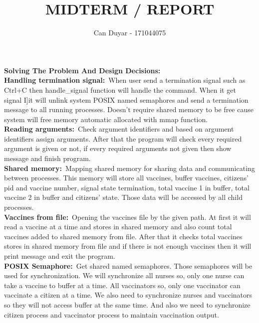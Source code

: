 \documentclass[a4 paper]{article}
\title{MIDTERM / REPORT}
\author{ Can Duyar - 171044075}
\begin{document}
\date{}
\maketitle

{\color{red}\large\textbf {Solving The Problem And Design Decisions:}}\newline\\
\newline
\textbf{Handling termination signal:}\newline\
\phantom{beta}When user send a termination signal such as Ctrl+C then handle\_signal function will handle the command. When it get signal I]it will unlink system POSIX named semaphores and send a termination message to all running processes. Doesn’t require shared memory to be free cause system will free memory automatic allocated with mmap function.\newline\\

\textbf{Reading arguments:}\newline\
\phantom{beta}Check argument identifiers and based on argument identifiers assign arguments. After that the program will check every required argument is given or not, if every required arguments not given then show message and finish program. \newline\\

\textbf{Shared memory:}\newline\
\phantom{beta}Mapping shared memory for sharing data and communicating between processes. This memory will store all vaccines, buffer vaccines, citizens’ pid and vaccine number, signal state termination, total vaccine 1 in buffer, total vaccine 2 in buffer and citizens’ state.  Those data will be accessed by all child processes.\newline\\


\textbf{Vaccines from file:}\newline\
\phantom{beta}Opening the vaccines file by the given path. At first it will read a vaccine at a time and stores in shared memory and also count total vaccines added to shared memory from file. After that it checks total vaccines stores in shared memory from file and if there is not enough vaccines then it will print message and exit the program.\newline\\


\textbf{POSIX Semaphore:}\newline\
\phantom{beta}Get shared named semaphores. Those semaphores will be used for synchronization. We will synchronize all nurses so, only one nurse can take a vaccine to buffer at a time. All vaccinators so, only one vaccinator can vaccinate a citizen at a time. We also need to synchronize nurses and vaccinators so they will not access buffer at the same time. And also we need to synchronize citizen process and vaccinator process to maintain vaccination output.\newline\\
\end{document}

